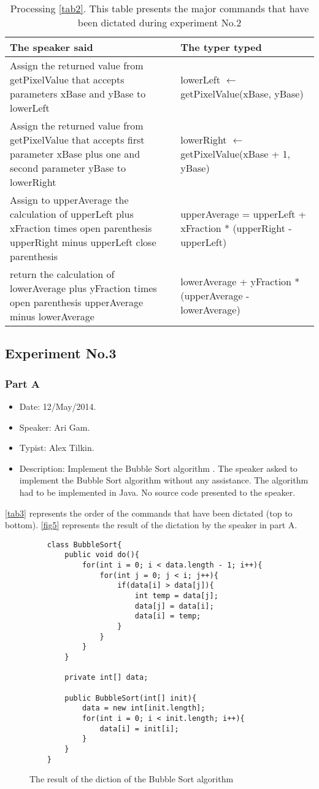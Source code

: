 \begin{table}[H]
	\begin{tabular}{|p{10cm}|p{6cm}|}
		\hline
		\rowcolor[HTML]{9B9B9B} 
		{\color[HTML]{000000} The speaker said} & {\color[HTML]{000000} The typer typed} \\ \hline
		Assign the returned value from getPixelValue that accepts parameters xBase and yBase to lowerLeft & lowerLeft $\leftarrow$ getPixelValue(xBase, yBase) \\ \hline
		Assign the returned value from getPixelValue that accepts first parameter xBase plus one and second parameter yBase to lowerRight & lowerRight $\leftarrow$ getPixelValue(xBase + 1, yBase) \\ \hline
		Assign to upperAverage the calculation of upperLeft plus xFraction times open parenthesis upperRight minus upperLeft close parenthesis & upperAverage = upperLeft + xFraction * (upperRight - upperLeft) \\ \hline
		return the calculation of lowerAverage plus yFraction times open parenthesis upperAverage minus lowerAverage & lowerAverage + yFraction * (upperAverage - lowerAverage) \\ \hline
	\end{tabular}
	\caption{Processing \autoref{tab2}. This table presents the major commands that have been dictated during experiment No.2}
	\label{tab8}
\end{table}
\subsection{Experiment No.3}
\subsubsection{Part A}
\begin{itemize}
	\item Date: 12/May/2014.
	\item Speaker: Ari Gam.
	\item Typist: Alex Tilkin.
	\item Description: Implement the Bubble Sort algorithm . The speaker asked to implement the Bubble Sort algorithm without any assistance. The algorithm had to be implemented in Java. No source code presented to the speaker.
\end{itemize}
\autoref{tab3} represents the order of the commands that have been dictated (top to bottom). \autoref{fig5} represents the result of the dictation by the speaker in part A.
\begin{figure}[H]
	\begin{lstlisting}
	class BubbleSort{
		public void do(){
			for(int i = 0; i < data.length - 1; i++){
				for(int j = 0; j < i; j++){
					if(data[i] > data[j]){
						int temp = data[j];
						data[j] = data[i];
						data[i] = temp;
					}
				}
			}
		}
		
		private int[] data;
		
		public BubbleSort(int[] init){
			data = new int[init.length];
			for(int i = 0; i < init.length; i++){
				data[i] = init[i];
			}
		}
	}
	\end{lstlisting}
	\caption{The result of the diction of the Bubble Sort algorithm}
	\label{fig5}
\end{figure}
